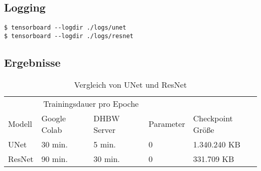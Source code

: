 \subsection{Logging}

\begin{code}
   \begin{verbatim}
$ tensorboard --logdir ./logs/unet
$ tensorboard --logdir ./logs/resnet
   \end{verbatim}
\end{code}

\subsection{Ergebnisse}
\begin{table}[H]
   \centering
   \begin{tabular}{lllll}
   \toprule
   & \multicolumn{2}{c}{Trainingsdauer pro Epoche} & \\
   
   \cmidrule(r){2-3}
   
   Modell & Google Colab & DHBW Server & Parameter & Checkpoint Größe \\
   \midrule
   UNet & 30 min. & 5 min. & 0 & 1.340.240 KB \\
   ResNet & 90 min. & 30 min. & 0 & 331.709 KB \\
   \bottomrule
   \end{tabular}
   \caption{Vergleich von UNet und ResNet}
\end{table}